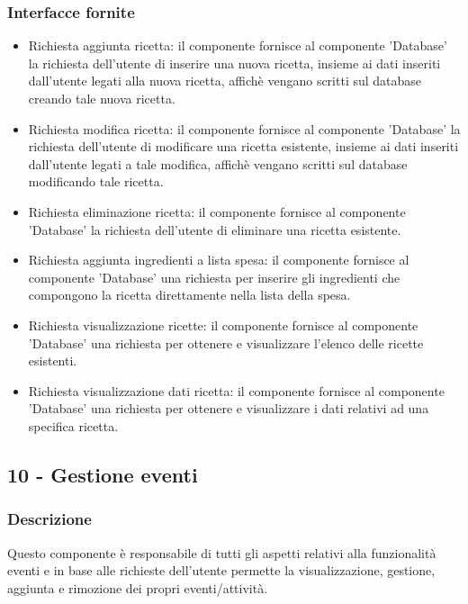 \documentclass[a4paper,12pt]{article}
\begin{document}
\subsubsection*{Interfacce fornite}
\begin{itemize} \setlength\itemsep{0.01em}
\item {\sffamily Richiesta aggiunta ricetta}: il componente fornisce al componente 'Database' la richiesta dell'utente di inserire una nuova ricetta, insieme ai dati inseriti dall'utente legati alla nuova ricetta, affichè vengano scritti sul database creando tale nuova ricetta.
\item {\sffamily Richiesta modifica ricetta}: il componente fornisce al componente 'Database'  la richiesta dell'utente di modificare una ricetta esistente, insieme ai dati inseriti dall'utente legati a tale modifica, affichè vengano scritti sul database modificando tale ricetta.
\item {\sffamily Richiesta eliminazione ricetta}: il componente fornisce al componente 'Database'  la richiesta dell'utente di eliminare una ricetta esistente.
\item {\sffamily Richiesta aggiunta ingredienti a lista spesa}: il componente fornisce al componente 'Database' una richiesta per inserire gli ingredienti che compongono la ricetta direttamente nella lista della spesa.
\item {\sffamily Richiesta visualizzazione ricette}: il componente fornisce al componente 'Database' una richiesta per ottenere e visualizzare l'elenco delle ricette esistenti.
\item {\sffamily Richiesta visualizzazione dati ricetta}: il componente fornisce al componente 'Database' una richiesta per ottenere e visualizzare i dati relativi ad una specifica ricetta.
\end{itemize}



\subsection*{10 -  Gestione eventi}
\subsubsection*{Descrizione}
Questo componente è responsabile di tutti gli aspetti relativi alla funzionalità eventi e in base alle richieste dell'utente permette la visualizzazione, gestione, aggiunta e rimozione dei propri eventi/attività.
\end{document}
